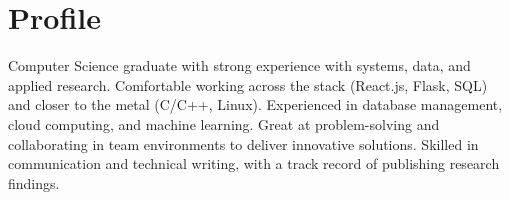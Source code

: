 \section*{Profile}
Computer Science graduate with strong experience with systems, data, and applied research.
Comfortable working across the stack (React.js, Flask, SQL) and closer to the metal (C/C++, Linux). 
Experienced in database management, cloud computing, and machine learning.
Great at problem-solving and collaborating in team environments to deliver innovative solutions.
Skilled in communication and technical writing, with a track record of publishing research findings.